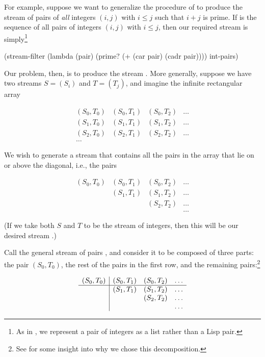 For example, suppose we want to generalize the  procedure
of  to produce the stream of pairs of \emph{all} integers
\( (i, j) \) with \( i \le j \) such that \( i + j \) is prime.  If
 is the sequence of all pairs of integers \( (i, j) \) with
\( i \le j \), then our required stream is simply\footnote{As in
, we represent a pair of integers as a list rather than a Lisp
pair.}

\begin{codeBlock}
(stream-filter
 (lambda (pair) (prime? (+ (car pair) (cadr pair))))
 int-pairs)
\end{codeBlock}

\noindent
Our problem, then, is to produce the stream .  More generally,
suppose we have two streams \( S = (S_i) \) and \( T = (T_j) \),
and imagine the infinite rectangular array

\[
\begin{matrix}
(S_0, T_0) & (S_0, T_1) & (S_0, T_2) & \dots \\
(S_1, T_0) & (S_1, T_1) & (S_1, T_2) & \dots \\
(S_2, T_0) & (S_2, T_1) & (S_2, T_2) & \dots \\
\dots      &            &            & 
\end{matrix}
\]

We wish to generate a stream that contains all the pairs in the array that lie
on or above the diagonal, i.e., the pairs

\[
\begin{matrix}
(S_0, T_0) & (S_0, T_1) & (S_0, T_2) & \dots \\
           & (S_1, T_1) & (S_1, T_2) & \dots \\
           &            & (S_2, T_2) & \dots \\
           &            &            & \dots 
\end{matrix}
\]

\noindent
(If we take both \( S \) and \( T \) to be the stream of integers, then this will
be our desired stream .)

Call the general stream of pairs , and consider it to be
composed of three parts: the pair \( (S_0, T_0) \), the rest of the pairs in
the first row, and the remaining pairs:\footnote{See  for
some insight into why we chose this decomposition.}

\[
\begin{array}{c|ccc}
(S_0, T_0) & (S_0, T_1) & (S_0, T_2) & \dots \\
\hline
           & (S_1, T_1) & (S_1, T_2) & \dots \\
           &            & (S_2, T_2) & \dots \\
           &            &            & \dots 
\end{array}
\]

